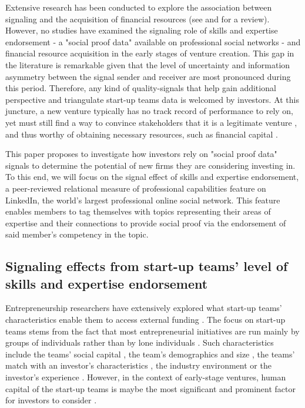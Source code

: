 \documentclass[12pt]{article}
\begin{document}
Extensive research has been conducted to explore the association between signaling and the acquisition of financial resources (see \citep{connelly2011signaling} and \citet{colombo2021use} for a review). However, no studies have examined the signaling role of skills and expertise endorsement - a "social proof data" available on professional social networks - and financial resource acquisition in the early stages of venture creation. This gap in the literature is remarkable given that the level of uncertainty \citep{matusik2008values} and information asymmetry between the signal sender and receiver \citep{spence2002signaling} are most pronounced during this period. Therefore, any kind of quality-signals that help gain additional perspective and triangulate start-up teams data is welcomed by investors. At this juncture, a new venture typically has no track record of performance to rely on, yet must still find a way to convince stakeholders that it is a legitimate venture \citep{becker2015new}, and thus worthy of obtaining necessary resources, such as financial capital \citep{ko2018signaling}.

This paper proposes to investigate how investors rely on "social proof data" signals to determine the potential of new firms they are considering investing in. To this end, we will focus on the signal effect of skills and expertise endorsement, a peer-reviewed relational measure of professional capabilities feature on LinkedIn, the world's largest professional online social network. This feature enables members to tag themselves with topics representing their areas of expertise and their connections to provide social proof via the endorsement of said member's competency in the topic.

\subsection{Signaling effects from start-up teams' level of skills and expertise endorsement}

Entrepreneurship researchers have extensively explored what start-up teams' characteristics enable them to access external funding \citep{roure1990predictors}. The focus on start-up teams stems from the fact that most entrepreneurial initiatives are run mainly by groups of individuals rather than by lone individuals \citep{klotz2014new}. Such characteristics include the teams' social capital \citep{shane2002network}, the team's demographics and size \citep{eisenhardt1990organizational}, the teams' match with an investor's characteristics \citep{aggarwal2015evaluating}, the industry environment \citep{townsend2015turning} or the investor's experience \citep{franke2008venture}. However, in the context of early-stage ventures, human capital of the start-up teams is maybe the most significant and prominent factor for investors to consider \citep{beckman2007early, ko2018signaling, matusik2008values}.
\end{document}
